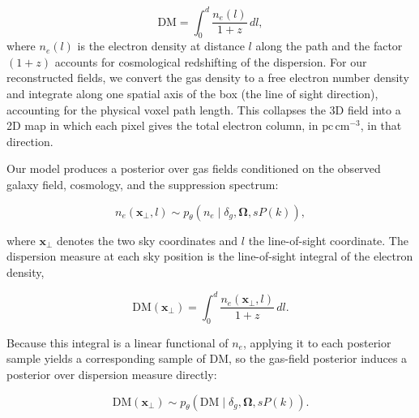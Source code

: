 \documentclass[twocolumn]{aastex631}
\begin{document}
\begin{equation}
\mathrm{DM} = \int_0^d \frac{n_e(l)}{1+z}\,dl,
\end{equation}
where $n_e(l)$ is the electron density at distance $l$ along the path and the factor $(1+z)$ accounts for cosmological redshifting of the dispersion. For our reconstructed fields, we convert the gas density to a free electron number density and integrate along one spatial axis of the box (the line of sight direction), accounting for the physical voxel path length. This collapses the 3D field into a 2D map in which each pixel gives the total electron column, in $\mathrm{pc\,cm^{-3}}$, in that direction.

Our model produces a posterior over gas fields conditioned on the observed galaxy field, cosmology, and the suppression spectrum:

\begin{equation}
n_e(\mathbf{x}_\perp, l) \sim p_\theta\!\left(n_e \mid \delta_g, \boldsymbol{\Omega}, sP(k)\right),
\end{equation}

where $\mathbf{x}_\perp$ denotes the two sky coordinates and $l$ the line-of-sight coordinate. The dispersion measure at each sky position is the line-of-sight integral of the electron density,

\begin{equation}
\mathrm{DM}(\mathbf{x}_\perp) = \int_0^d \frac{n_e(\mathbf{x}_\perp, l)}{1+z}\, dl.
\end{equation}

Because this integral is a linear functional of $n_e$, applying it to each posterior sample yields a corresponding sample of DM, so the gas-field posterior induces a posterior over dispersion measure directly:

\begin{equation}
\mathrm{DM}(\mathbf{x}_\perp) \sim p_\theta\!\left(\mathrm{DM} \mid \delta_g, \boldsymbol{\Omega}, sP(k)\right).
\end{equation}
\end{document}
